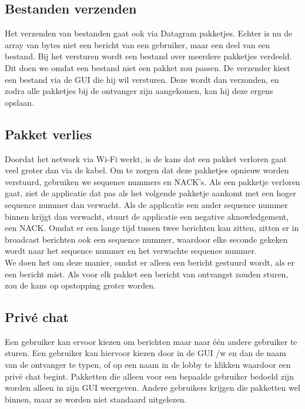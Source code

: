 \documentclass{article}
\begin{document}
\subsection{Bestanden verzenden}
Het verzenden van bestanden gaat ook via Datagram pakketjes. Echter is nu de array van bytes niet een bericht van een gebruiker, maar een deel van een bestand. Bij het versturen wordt een bestand over meerdere pakketjes verdeeld. Dit doen we omdat een bestand niet een pakket zou passen. De verzender kiest een bestand via de GUI die hij wil versturen. Deze wordt dan verzonden, en zodra alle pakketjes bij de ontvanger zijn aangekomen, kan hij deze ergens opslaan. \\


\subsection{Pakket verlies}
Doordat het network via Wi-Fi werkt, is de kans dat een pakket verloren gaat veel groter dan via de kabel. Om te zorgen dat deze pakketjes opnieuw worden verstuurd, gebruiken we sequence nummers en NACK's. Als een pakketje verloren gaat, ziet de applicatie dat pas als het volgende pakketje aankomt met een hoger sequence nummer dan verwacht. Als de applicatie een ander sequence nummer binnen krijgt dan verwacht, stuurt de applicatie een negative aknowledgement, een NACK. Omdat er een lange tijd tussen twee berichten kan zitten, zitten er in broadcast berichten ook een sequence nummer, waardoor elke seconde gekeken wordt naar het sequence nummer en het verwachte sequence nummer. \\
We doen het om deze manier, omdat er alleen een bericht gestuurd wordt, als er een bericht mist. Als voor elk pakket een bericht van ontvangst zouden sturen, zou de kans op opstopping groter worden. \\

\subsection{Priv\'{e} chat}
Een gebruiker kan ervoor kiezen om berichten maar naar \'{e}\'{e}n andere gebruiker te sturen. Een gebruiker kan hiervoor kiezen door in de GUI /w en dan de naam van de ontvanger te typen, of op een naam in de lobby te klikken waardoor een priv\'{e} chat begint. Pakketten die alleen voor een bepaalde gebruiker bedoeld zijn worden alleen in zijn GUI weergeven. Andere gebruikers krijgen die pakketten wel binnen, maar ze worden niet standaard uitgelezen. \\
\end{document}
